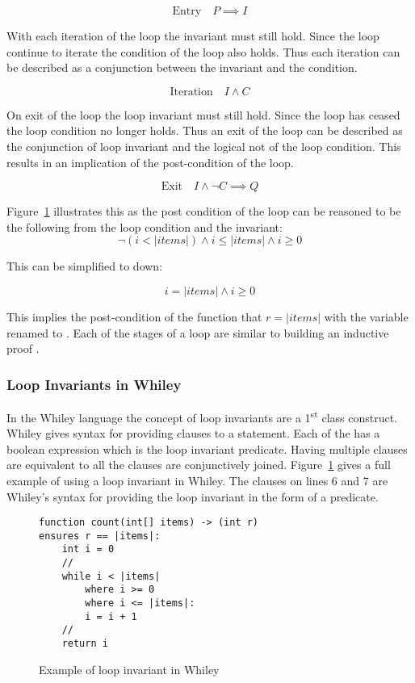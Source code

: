 $$\text{Entry} \quad P \implies I$$

With each iteration of the loop the invariant must still hold.
Since the loop continue to iterate the condition of the loop
also holds. Thus each iteration can be described as a conjunction
between the invariant and the condition.

$$\text{Iteration} \quad I \wedge C $$

On exit of the loop the loop invariant must still hold.
Since the loop has ceased the loop condition no longer
holds. Thus an exit of the loop can be described
as the conjunction of loop invariant and the logical
not of the loop condition.
This results in an implication of the post-condition of the
loop.

$$\text{Exit} \quad I \wedge \neg{C} \implies Q$$

Figure~\ref{lst:whiley-inv} illustrates this as the
post condition of the loop can be reasoned to be the following
from the loop condition and the invariant:
$$\neg{ ( i < |items| ) } \wedge i \leq |items| \wedge i \geq 0$$

This can be simplified to down:

$$ i = |items| \wedge i \geq 0$$

This implies the post-condition of the function that $r = |items|$ with
the variable  renamed to .
Each of the stages of a loop are similar to building an inductive proof \cite{invarints-classifiction}.

\subsubsection{Loop Invariants in Whiley}

In the Whiley language the concept of loop invariants are a 1\textsuperscript{st} class
construct.
Whiley gives syntax for providing  clauses to a 
statement.
Each of the  has a boolean expression which is the loop
invariant predicate.
Having multiple  clauses are equivalent to all the clauses are
conjunctively joined.
Figure~\ref{lst:whiley-inv} gives a full example of using a loop invariant
in Whiley. The  clauses on lines 6 and 7 are Whiley's syntax for
providing the loop invariant in the form of a predicate.

\begin{figure}[ht]
\begin{lstlisting}
function count(int[] items) -> (int r)
ensures r == |items|:
    int i = 0
    //
    while i < |items|
        where i >= 0
        where i <= |items|:
        i = i + 1
    //
    return i
\end{lstlisting}
    \caption{Example of loop invariant in Whiley}
    \label{lst:whiley-inv}
\end{figure}

